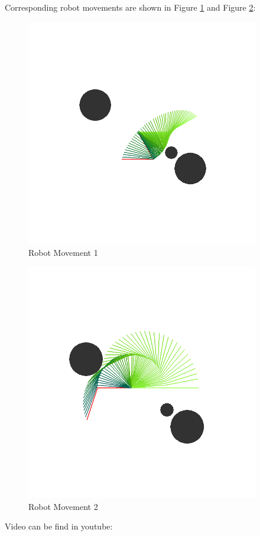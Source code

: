 \documentclass{article}
\begin{document}
    Corresponding robot movements are shown in Figure \ref{fig:move1} and Figure \ref{fig:move2}:

    \begin{figure}
      \centering
      \includegraphics[width=4in]{Movement1.PNG}
      \caption{Robot Movement 1}
      \label{fig:move1}
    \end{figure}

    \begin{figure}
      \centering
      \includegraphics[width=4in]{Movement2.PNG}
      \caption{Robot Movement 2}
      \label{fig:move2}
    \end{figure}

    Video can be find in youtube: 
    
\end{document}
